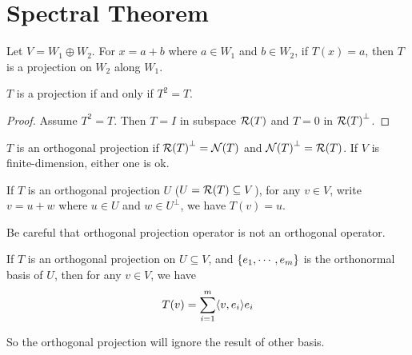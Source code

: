 \section{Spectral Theorem}

\begin{definition}
    Let $V = W_1 \oplus W_2$. For $x = a + b$ where $a \in W_1$ and $b \in W_2$, if $T(x) = a$, then $T$ is a projection on $W_2$ along $W_1$.
\end{definition}


\begin{theorem}
    $T$ is a projection if and only if $T^2 = T$.    
\end{theorem}
\begin{proof}
    Assume $T^2 = T$. Then $T=I$ in subspace $\rangespace{T}$ and $T = 0$ in $\rangespace{T}^\perp$.
\end{proof}

\begin{definition}
    $T$ is an orthogonal projection if $\rangespace{T}^\perp = \nullspace{T}$ and $\nullspace{T}^\perp = \rangespace{T}$. If $V$ is finite-dimension, either one is ok.
    
    If $T$ is an orthogonal projection $U$ ($U = \rangespace{T} \subseteq V$), for any $v \in V$, write $v = u + w$ where $u \in U$ and $w \in U^\perp$, we have $T(v) = u$.
\end{definition}

Be careful that orthogonal projection operator is not an orthogonal operator.

\begin{theorem}
    If $T$ is an orthogonal projection on $U \subseteq V$, and $\set{e_1, \cdots, e_m}$ is the orthonormal basis of $U$, then for any $v \in V$, we have
    \begin{equation}
        T(v) = \sum_{i=1}^{m} \innerproduct{v}{e_i} e_i
    \end{equation}
    
    So the orthogonal projection will ignore the result of other basis.
\end{theorem}



